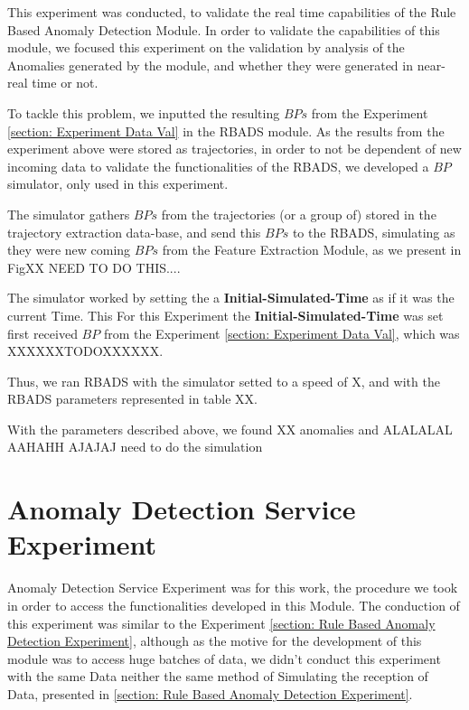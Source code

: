 This experiment was conducted, to validate the real time capabilities of the Rule Based Anomaly Detection Module. In order to validate the capabilities of this module, we focused this experiment on the validation by analysis of the Anomalies generated by the module, and whether they were generated in near-real time or not.

To tackle this problem, we inputted the resulting $BPs$ from the Experiment \ref{section: Experiment Data Val} in the RBADS module. As the results from the experiment above were stored as trajectories, in order to not be dependent of new incoming data to validate the functionalities of the RBADS, we developed a $BP$ simulator, only used in this experiment.

The simulator gathers $BPs$ from the trajectories (or a group of) stored in the trajectory extraction data-base, and send this $BPs$ to the RBADS, simulating as they were new coming $BPs$ from the Feature Extraction Module, as we present in FigXX NEED TO DO THIS....


The simulator worked by setting the a \textbf{Initial-Simulated-Time} as if it was the current Time. This 
For this Experiment the \textbf{Initial-Simulated-Time} was set first received $BP$ from the Experiment \ref{section: Experiment Data Val}, which was XXXXXXTODOXXXXXX.

Thus, we ran RBADS with the simulator setted to a speed of X, and with the RBADS parameters represented in table XX.


With the parameters described above, we found XX anomalies and ALALALAL AAHAHH AJAJAJ need to do the simulation




\section{Anomaly Detection Service Experiment}
Anomaly Detection Service Experiment was for this work, the procedure we took in order to access the functionalities developed in this Module. The conduction of this experiment was similar to the Experiment \ref{section: Rule Based Anomaly Detection Experiment}, although as the motive for the development of this module was to access huge batches of data, we didn't conduct this experiment with the same Data neither the same method of Simulating the reception of Data, presented in \ref{section: Rule Based Anomaly Detection Experiment}.

